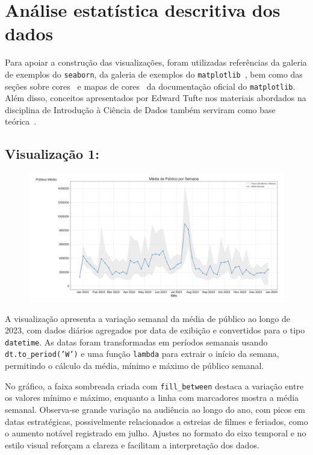 \documentclass{article}
\begin{document}
\pagebreak
\linespread{1.5}
\section{Análise estatística descritiva dos dados}

Para apoiar a construção das visualizações, foram utilizadas referências da galeria de exemplos do \texttt{seaborn}\cite{seaborn_examples}, da galeria de exemplos do \texttt{matplotlib}~\cite{matplotlib_gallery}, bem como das seções sobre cores~\cite{matplotlib_colors} e mapas de cores~\cite{matplotlib_colormaps} da documentação oficial do \texttt{matplotlib}. Além disso, conceitos apresentados por Edward Tufte nos materiais abordados na disciplina de Introdução à Ciência de Dados também serviram como base teórica~\cite{tufte_visual_display}\cite{tufte_visual_explanations}.

\subsection*{Visualização 1:}
\begin{figure}[H]
    \centerline{\includegraphics[width =\linewidth]{img/Figure_1.png}}
\end{figure}
A visualização apresenta a variação semanal da média de público ao longo de 2023, com dados diários agregados por data de exibição e convertidos para o tipo \texttt{datetime}. As datas foram transformadas em períodos semanais usando \texttt{dt.to\_period('W')} e uma função \texttt{lambda} para extrair o início da semana, permitindo o cálculo da média, mínimo e máximo de público semanal.

No gráfico, a faixa sombreada criada com \texttt{fill\_between} destaca a variação entre os valores mínimo e máximo, enquanto a linha com marcadores mostra a média semanal. Observa-se grande variação na audiência ao longo do ano, com picos em datas estratégicas, possivelmente relacionados a estreias de filmes e feriados, como o aumento notável registrado em julho. Ajustes no formato do eixo temporal e no estilo visual reforçam a clareza e facilitam a interpretação dos dados.~\cite{tufte_visual_display}\cite{tufte_visual_explanations}
\end{document}
